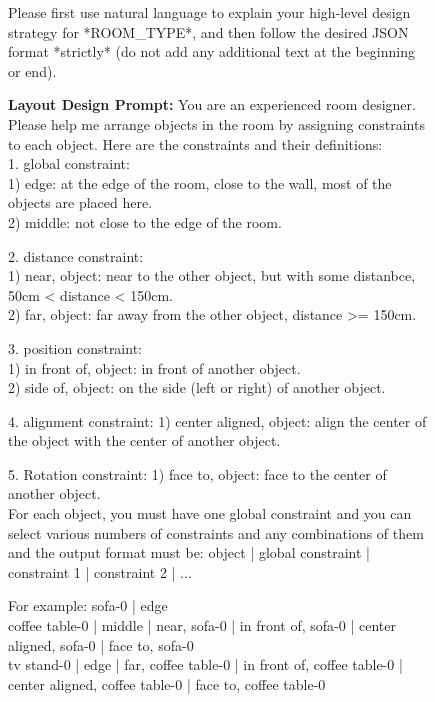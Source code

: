 \begin{figure}[!t]
\begin{center}
\begin{tcolorbox} [top=2pt,bottom=2pt, width=\linewidth, boxrule=1pt]
{{    Please first use natural language to explain your high-level design strategy for *ROOM\_TYPE*, and then follow the desired JSON format *strictly* (do not add any additional text at the beginning or end).
    }
    \par}
    \end{tcolorbox}

    \begin{tcolorbox} [top=2pt,bottom=2pt, width=\linewidth, boxrule=1pt]
    {\footnotesize {\selectfont
    \textbf{Layout Design Prompt:}
    You are an experienced room designer.
    Please help me arrange objects in the room by assigning constraints to each object.
    Here are the constraints and their definitions: \\
    1. global constraint: \\
        1) edge: at the edge of the room, close to the wall, most of the objects are placed here. \\
        2) middle: not close to the edge of the room.
    
    2. distance constraint: \\
        1) near, object: near to the other object, but with some distanbce, 50cm < distance < 150cm. \\
        2) far, object: far away from the other object, distance >= 150cm.

    3. position constraint: \\
        1) in front of, object: in front of another object. \\
        2) side of, object: on the side (left or right) of another object.
    
    4. alignment constraint:
        1) center aligned, object: align the center of the object with the center of another object.
    
    5. Rotation constraint:
        1) face to, object: face to the center of another object. \\
    
    For each object, you must have one global constraint and you can select various numbers of constraints and any combinations of them and the output format must be:
    object | global constraint | constraint 1 | constraint 2 | ...
    
    For example:
    sofa-0 | edge \\
    coffee table-0 | middle | near, sofa-0 | in front of, sofa-0 | center aligned, sofa-0 | face to, sofa-0 \\
    tv stand-0 | edge | far, coffee table-0 | in front of, coffee table-0 | center aligned, coffee table-0 | face to, coffee table-0 \\
    
}}
\end{tcolorbox}
\end{center}
\end{figure}
